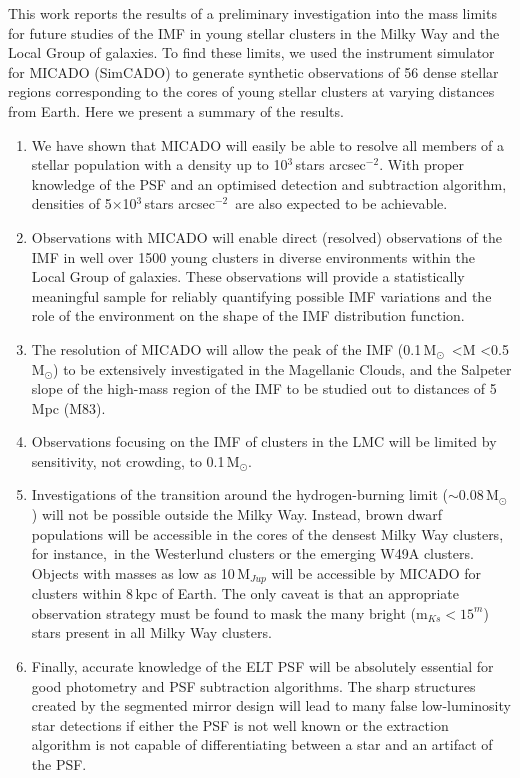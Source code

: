 \documentclass[referee]{aa}
\newcommand{\msun}{M$_\odot$~}
\newcommand{\msune}{M$_\odot$}
\newcommand{\s}{$\sim$}
\newcommand{\h}[1]{$^{#1}$}
\newcommand{\spa}{stars arcsec$^{-2}$~}
\newcommand{\spae}{stars arcsec$^{-2}$}
\begin{document}
This work reports the results of a preliminary investigation into the mass limits for future studies of the IMF in young stellar clusters in the Milky Way and the Local Group of galaxies.
To find these limits, we used the instrument simulator for MICADO (SimCADO) to generate synthetic observations of 56 dense stellar regions corresponding to the cores of young stellar clusters at varying distances from Earth.
Here we present a summary of the results.

\begin{enumerate}
    \item We have shown that MICADO will easily be able to resolve all members of a stellar population with a density up to 10\h3\,\spae.
    With proper knowledge of the PSF and an optimised detection and subtraction algorithm, densities of 5$\times$10\h3\,\spa are also expected to be achievable.

    \item Observations with MICADO will enable direct (resolved) observations of the IMF in well over 1500 young clusters in diverse environments within the Local Group of galaxies.
    These observations will provide a statistically meaningful sample for reliably quantifying possible IMF variations and the role of the environment on the shape of the IMF distribution function.

    \item The resolution of MICADO will allow the peak of the IMF (0.1\,\msun\textless M \textless0.5\,\msune) to be extensively investigated in the Magellanic Clouds, and the Salpeter slope of the high-mass region of the IMF to be studied out to distances of 5\,Mpc (M83).

    \item Observations focusing on the IMF of clusters in the LMC will be limited by sensitivity, not crowding, to 0.1\,\msune.

    \item Investigations of the transition around the hydrogen-burning limit (\s0.08\,\msune) will not be possible outside the Milky Way.
    Instead, brown dwarf populations will be accessible in the cores of the densest Milky Way clusters, for instance,\ in the Westerlund clusters or the emerging W49A clusters.
    Objects with masses as low as 10\,M$_{Jup}$ will be accessible by MICADO for clusters within 8\,kpc of Earth.
    The only caveat is that an appropriate observation strategy must be found to mask the many bright (m$_{Ks}<15^m$) stars present in all Milky Way clusters.

    \item Finally, accurate knowledge of the ELT PSF will be absolutely essential for good photometry and PSF subtraction algorithms.
    The sharp structures created by the segmented mirror design will lead to many false low-luminosity star detections if either the PSF is not well known or the extraction algorithm is not capable of differentiating between a star and an artifact of the PSF\@.

\end{enumerate}
\end{document}
